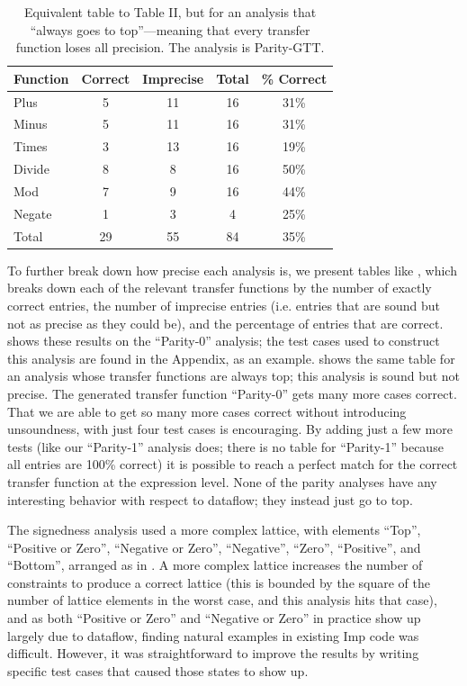 \documentclass[10pt,conference]{IEEEtran}
\begin{document}
\begin{table}
\centering
 \begin{tabular}{l c c c c }
  
  Function & Correct & Imprecise & Total & \% Correct\\ 
  \midrule
  Plus & 5 & 11 & 16 & 31\% \\
  Minus & 5 & 11 & 16 & 31\% \\
  Times & 3 & 13 & 16 & 19\% \\
  Divide & 8 & 8 & 16 & 50\% \\
  Mod & 7 & 9 & 16 & 44\% \\
  Negate & 1 & 3 & 4 & 25\% \\
  \midrule
  Total & 29 & 55 & 84 & 35\% \\
 \end{tabular}
 \caption{Equivalent table to Table II, but for an
 analysis that ``always goes to top''---meaning that every
 transfer function loses all precision. The analysis is Parity-GTT.}
 \label{tab-top}
\end{table}

To further break
down how precise each analysis is, we present tables like , which breaks
down each of the relevant transfer functions by the number of exactly correct
entries, the
number of imprecise entries (i.e. entries that are sound but not as precise
as they could be), and the percentage of entries that are correct.
 shows these results on the ``Parity-0'' analysis; the
test cases used to construct this analysis are found in the Appendix, as an
example.
 shows the same table for an analysis whose
transfer functions are always top; this analysis is sound but not precise.
The generated transfer function ``Parity-0'' gets many more cases correct.
That we are able to get so many more cases correct
without introducing unsoundness, with just four test cases
is encouraging. By adding just a few more tests (like our ``Parity-1''
analysis does; there is no table for ``Parity-1'' because all entries
are 100\% correct) it is possible to reach a perfect match for the correct
transfer function at the expression level. None of the parity analyses
have any interesting behavior with respect to dataflow; they instead
just go to top.

The signedness analysis used a more complex lattice, with elements 
``Top'', ``Positive or Zero'', ``Negative or Zero'', ``Negative'',
``Zero'', ``Positive'', and ``Bottom'', arranged as in .  
A more complex lattice increases the number of constraints to produce a 
correct lattice (this is bounded by the square of the number of lattice elements in the 
worst case, and this analysis hits that case), and as both ``Positive or Zero''
and ``Negative or Zero'' in practice show up largely due to dataflow, finding
natural examples in existing Imp code was difficult.  However, it was straightforward
to improve the results by writing specific test cases that caused those states to show up.
\end{document}
